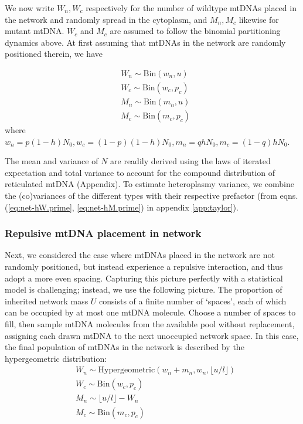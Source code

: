 \documentclass{article}
\newcommand{\be}{\begin{equation}}
\newcommand{\ee}{\end{equation}}
\begin{document}
We now write $W_n, W_c$ respectively for the number of wildtype mtDNAs placed in the network and randomly spread in the cytoplasm, and $M_n, M_c$ likewise for mutant mtDNA. $W_c$ and $M_c$ are assumed to follow the binomial partitioning dynamics above. At first assuming that mtDNAs in the network are randomly positioned therein, we have

\be\label{eq:methods-model}
    \begin{split}
        & W_n \sim \mathrm{Bin}\left(w_n,u\right) \\
        & W_c \sim \mathrm{Bin}\left(w_c,p_c\right) \\
        & M_n \sim \mathrm{Bin}\left(m_n,u\right) \\
        & M_c \sim \mathrm{Bin}\left(m_c,p_c\right)
    \end{split}
\ee
where $w_n = p(1-h)N_0, w_c = (1-p)(1-h)N_0, m_n = qhN_0, m_c = (1-q)hN_0$.

The mean and variance of $N$ are readily derived using the laws of iterated expectation and total variance to account for the compound distribution of reticulated mtDNA (Appendix). To estimate heteroplasmy variance, we combine the (co)variances of the different types with their respective prefactor (from eqns. (\ref{eq:net-hW.prime}, \ref{eq:net-hM.prime}) in appendix \ref{app:taylor}).

\subsubsection*{Repulsive mtDNA placement in network}
Next, we considered the case where mtDNAs placed in the network are not randomly positioned, but instead experience a repulsive interaction, and thus adopt a more even spacing. Capturing this picture perfectly with a statistical model is challenging; instead, we use the following picture. The proportion of inherited network mass $U$ consists of a finite number of `spaces', each of which can be occupied by at most one mtDNA molecule. Choose a number of spaces to fill, then sample mtDNA molecules from the available pool without replacement, assigning each drawn mtDNA to the next unoccupied network space. In this case, the final population of mtDNAs in the network is described by the hypergeometric distribution:
\be\label{eq:model-repel}
    \begin{split}
        & W_n \sim \mathrm{Hypergeometric}(w_n+m_n,w_n,\lfloor u/l \rfloor) \\
        & W_c \sim \mathrm{Bin}\left(w_c,p_c\right) \\
        & M_n \sim \lfloor u/l \rfloor-W_n \\
        & M_c \sim \mathrm{Bin}\left(m_c,p_c\right)
    \end{split}
\ee
\end{document}
